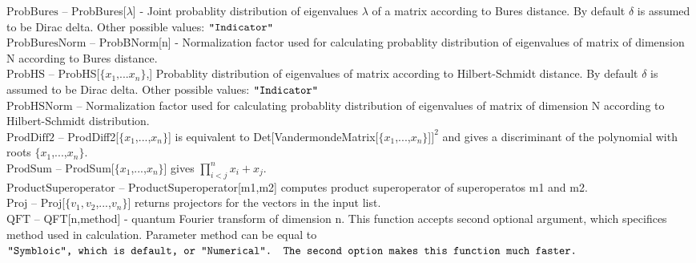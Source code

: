 \documentclass[a4paper,11pt]{article}
\begin{document}
\textbf{$ \text{ProbBures} $ }-- ProbBures[$\lambda $] - Joint probablity distribution of eigenvalues $\lambda $ of a matrix according to Bures distance. By default $\delta $ is assumed to be Dirac delta. Other possible values: $\texttt{"$ $Indicator$\texttt{"}$} $\\

\textbf{$ \text{ProbBuresNorm} $ }-- ProbBNorm[n] - Normalization factor used for calculating probablity distribution of eigenvalues of matrix of dimension N according to Bures distance.$  $\\

\textbf{$ \text{ProbHS} $ }-- ProbHS[$\{$$ x_1\text{,...}x_n $$\}$,] Probablity distribution of eigenvalues of matrix according to Hilbert-Schmidt distance. By default $\delta $ is assumed to be Dirac delta. Other possible values: $\texttt{"$ $Indicator$\texttt{"}$} $\\

\textbf{$ \text{ProbHSNorm} $ }-- Normalization factor used for calculating probablity distribution of eigenvalues of matrix of dimension N according to Hilbert-Schmidt distribution.$  $\\

\textbf{$ \text{ProdDiff2} $ }-- ProdDiff2[$\{$$ x_1 $,...,$ x_n $$\}$] is equivalent to Det[VandermondeMatrix[$\{$$ x_1 $,...,$ x_n $$\}$]$ ]^2 $ and gives a discriminant of the polynomial with roots $\{$$ x_1 $,...,$ x_n $$\}$.$  $\\

\textbf{$ \text{ProdSum} $ }-- ProdSum[$\{$$ x_1 $,...,$ x_n $$\}$] gives $ \prod _{i<j}^nx_i+x_j. $\\

\textbf{$ \text{ProductSuperoperator} $ }-- ProductSuperoperator[m1,m2] computes product superoperator of superoperatos m1 and m2.$  $\\

\textbf{$ \text{Proj} $ }-- Proj[$\{$$ v_1,v_2 $,...,$ v_n $$\}$] returns projectors for the vectors in the input list.$  $\\

\textbf{$ \text{QFT} $ }-- QFT[n,method] - quantum Fourier transform of dimension n. This function accepts second optional argument, which specifices method used in calculation. Parameter method can be equal to $\texttt{"$ $Symbloic$\texttt{"}$, which is default, or $\texttt{"}$Numerical$\texttt{"}$. The second option makes this function much faster.} $\\
\end{document}
